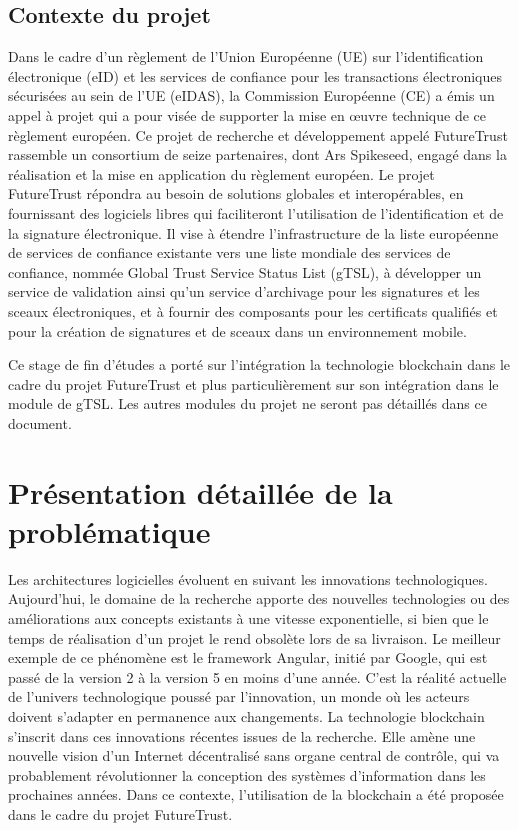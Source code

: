 \documentclass{tnreport}
\begin{document}
\section{Contexte du projet}

Dans le cadre d'un règlement de l'Union Européenne (UE) sur l'identification électronique (eID) et les services de confiance pour les transactions électroniques sécurisées au sein de l'UE (eIDAS), la Commission Européenne (CE) a émis un appel à projet qui a pour visée de supporter la mise en œuvre technique de ce règlement européen. 
Ce projet de recherche et développement appelé FutureTrust rassemble un consortium de seize partenaires, dont Ar{\texteta}s Spikeseed, engagé dans la réalisation et la mise en application du règlement européen. 
Le projet FutureTrust répondra au besoin de solutions globales et interopérables, en fournissant des logiciels libres qui faciliteront l'utilisation de l'identification et de la signature électronique. 
Il vise à étendre l'infrastructure de la liste européenne de services de confiance existante vers une liste mondiale des services de confiance, nommée Global Trust Service Status List (gTSL), à développer un service de validation ainsi qu'un service d'archivage pour les signatures et les sceaux électroniques, et à fournir des composants pour les certificats qualifiés et pour la création de signatures et de sceaux dans un environnement mobile.

Ce stage de fin d'études a porté sur l'intégration la technologie blockchain dans le cadre du projet FutureTrust et plus particulièrement sur son intégration dans le module de gTSL. Les autres modules du projet ne seront pas détaillés dans ce document. 

\chapter{Présentation détaillée de la problématique}

Les architectures logicielles évoluent en suivant les innovations technologiques. Aujourd'hui, le domaine de la recherche apporte des nouvelles technologies ou des améliorations aux concepts existants à une vitesse exponentielle, si bien que 
le temps de réalisation d'un projet le rend obsolète lors de sa livraison.
Le meilleur exemple de ce phénomène est le framework Angular, initié par Google, qui est passé de la version 2 à la version 5 en moins d'une année. C'est la réalité actuelle de l'univers technologique poussé par l'innovation, un monde où les acteurs doivent s'adapter en permanence aux changements. La technologie blockchain s'inscrit dans ces innovations récentes issues de la recherche. Elle amène une nouvelle vision d'un Internet décentralisé sans organe central de contrôle, qui va probablement révolutionner la conception des systèmes d'information dans les prochaines années. Dans ce contexte, l'utilisation de la blockchain a été proposée dans le cadre du projet FutureTrust.
\end{document}
